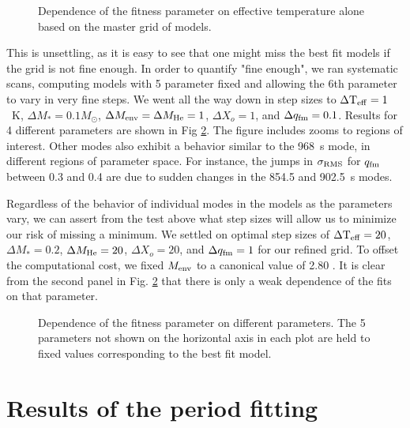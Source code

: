 \documentclass[12pt,preprint]{aastex}
\begin{document}
\begin{figure}
\caption{
Dependence of the fitness parameter on effective temperature alone based on 
the master grid of models. \label{ffit3}
}
\end{figure}

This is unsettling, as it is easy to see that one might miss the best fit 
models if the grid is not fine enough. In order to quantify "fine enough", 
we ran systematic scans, computing models with 5 parameter fixed and allowing 
the 6th parameter to vary in very fine steps. We went all the way down in 
step sizes to $\Delta {\rm T_{eff}}=1$~K, $\Delta M_*=0.1 M_\odot$, 
$\Delta M_{\rm env}= \Delta M_{\rm He}=1$, $\Delta X_o=1$, and $\Delta q_{\rm fm}=0.1$. 
Results for 4 different parameters are shown in Fig \ref{ffit4}. The figure 
includes zooms to regions of interest. Other modes also exhibit a behavior 
similar to the 968~s mode, in different regions of parameter space. For instance, 
the jumps in $\sigma_{\rm RMS}$ for $q_{\rm fm}$ between 0.3 and 0.4 are due 
to sudden changes in the 854.5 and 902.5~s modes.

Regardless of the behavior of individual modes in the models as the parameters vary, 
we can assert from the test above what step sizes will allow us to minimize our risk 
of missing a minimum. We settled on optimal step sizes of 
$\Delta {\rm T_{eff}}=20$, $\Delta M_*=0.2$, $\Delta M_{\rm He}=20$, 
$\Delta X_o=20$, and $\Delta q_{\rm fm}=1$ for our refined grid. To offset 
the computational cost, we fixed $M_{\rm env}$ to a canonical value of 
2.80 \citep{Dehner95}. It is clear from the second panel in Fig. \ref{ffit4} 
that there is only a weak dependence of the fits on that parameter.
		
\begin{figure}
\caption{
  \label{ffit4}
Dependence of the fitness parameter on different parameters. The 5 parameters not 
shown on the horizontal axis in each plot are held to fixed values corresponding 
to the best fit model. \label{ffit4}
}
\end{figure}

\section{Results of the period fitting}
\end{document}
